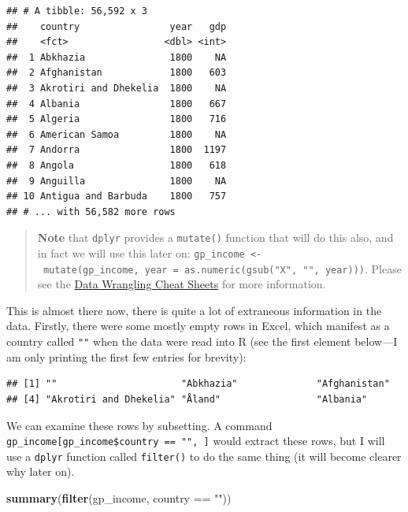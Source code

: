 \documentclass[]{book}
\newenvironment{Shaded}{\begin{snugshade}}{\end{snugshade}}
\newcommand{\KeywordTok}[1]{\textcolor[rgb]{0.13,0.29,0.53}{\textbf{{#1}}}}
\newcommand{\StringTok}[1]{\textcolor[rgb]{0.31,0.60,0.02}{{#1}}}
\newcommand{\NormalTok}[1]{{#1}}
\theoremstyle{definition}
\theoremstyle{definition}
\theoremstyle{definition}
\theoremstyle{remark}
\begin{document}
\begin{verbatim}
## # A tibble: 56,592 x 3
##    country                year   gdp
##    <fct>                 <dbl> <int>
##  1 Abkhazia               1800    NA
##  2 Afghanistan            1800   603
##  3 Akrotiri and Dhekelia  1800    NA
##  4 Albania                1800   667
##  5 Algeria                1800   716
##  6 American Samoa         1800    NA
##  7 Andorra                1800  1197
##  8 Angola                 1800   618
##  9 Anguilla               1800    NA
## 10 Antigua and Barbuda    1800   757
## # ... with 56,582 more rows
\end{verbatim}

\begin{quote}
\textbf{Note} that \texttt{dplyr} provides a \texttt{mutate()} function
that will do this also, and in fact we will use this later on:
\texttt{gp\_income\ \textless{}-\ mutate(gp\_income,\ year\ =\ as.numeric(gsub("X",\ "",\ year)))}.
Please see the
\href{https://www.rstudio.com/resources/cheatsheets/}{Data Wrangling
Cheat Sheets} for more information.
\end{quote}

This is almost there now, there is quite a lot of extraneous information
in the data. Firstly, there were some mostly empty rows in Excel, which
manifest as a country called \texttt{""} when the data were read into R
(see the first element below---I am only printing the first few entries
for brevity):

\begin{Shaded}
\end{Shaded}

\begin{verbatim}
## [1] ""                      "Abkhazia"              "Afghanistan"          
## [4] "Akrotiri and Dhekelia" "Åland"                 "Albania"
\end{verbatim}

We can examine these rows by subsetting. A command
\texttt{gp\_income{[}gp\_income\$country\ ==\ "",\ {]}} would extract
these rows, but I will use a \texttt{dplyr} function called
\texttt{filter()} to do the same thing (it will become clearer why later
on).

\begin{Shaded}
\begin{Highlighting}[]
\KeywordTok{summary}\NormalTok{(}\KeywordTok{filter}\NormalTok{(gp_income, country ==}\StringTok{ ""}\NormalTok{))}
\end{Highlighting}
\end{Shaded}
\end{document}
